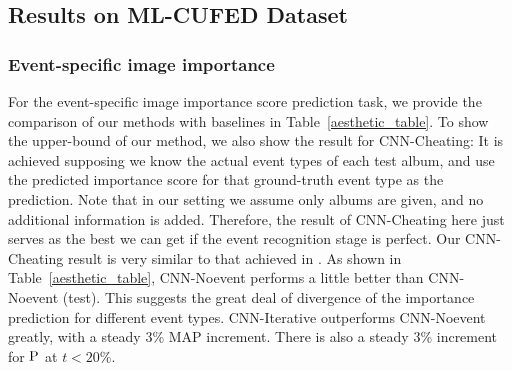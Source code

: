 \documentclass[runningheads]{llncs}
\begin{document}
\subsection{Results on ML-CUFED Dataset}
\subsubsection{Event-specific image importance}

For the event-specific image importance score prediction task, we provide the comparison of our methods with baselines in Table~\ref{aesthetic_table}. To show the upper-bound of our method, we also show the result for CNN-Cheating: It is achieved supposing we know the actual event types of each test album, and use the predicted importance score for that ground-truth event type as the prediction. Note that in our setting we assume only albums are given, and no additional information is added. Therefore, the result of CNN-Cheating here just serves as the best we can get if the event recognition stage is perfect. Our CNN-Cheating result is very similar to that achieved in \cite{CVPR}. As shown in Table~\ref{aesthetic_table}, CNN-Noevent performs a little better than CNN-Noevent (test). This suggests the great deal of divergence of the importance prediction for different event types. CNN-Iterative outperforms CNN-Noevent greatly, with a steady 3\% MAP increment. There is also a steady 3\% increment for $\textup{P}$ at $t<20\%$.
\end{document}

